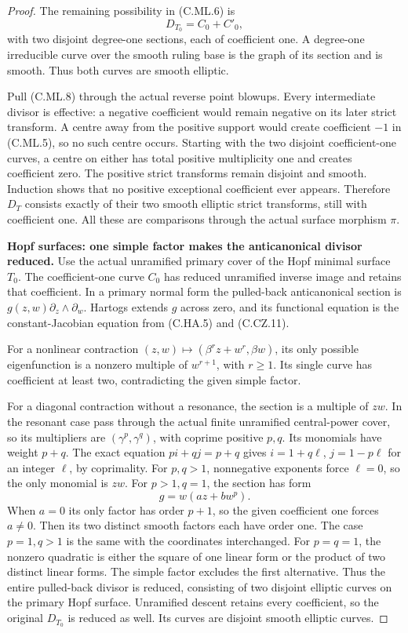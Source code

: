 \begin{proof}
The remaining possibility in (C.ML.6) is
\[
                     D_{T_0}=C_0+C'_0,
\tag{C.ML.8}
\]
with two disjoint degree-one sections, each of
coefficient one. A degree-one irreducible curve
over the smooth ruling base is the graph of
its section and is smooth. Thus both curves
are smooth elliptic.

Pull (C.ML.8) through the actual reverse point
blowups. Every intermediate divisor is effective:
a negative coefficient would remain negative
on its later strict transform. A centre away
from the positive support would create coefficient
\(-1\) in (C.ML.5), so no such centre occurs.
Starting with the two disjoint coefficient-one
curves, a centre on either has total positive
multiplicity one and creates coefficient zero.
The positive strict transforms remain disjoint
and smooth. Induction shows that no positive
exceptional coefficient ever appears. Therefore
\(D_T\) consists exactly of their two smooth
elliptic strict transforms, still with coefficient
one. All these are comparisons through the actual
surface morphism \(\pi\).

\par\medskip\noindent\textbf{Hopf surfaces: one simple factor makes the anticanonical divisor reduced.}
Use the actual unramified primary cover of the
Hopf minimal surface \(T_0\). The coefficient-one
curve \(C_0\) has reduced unramified inverse
image and retains that coefficient. In a primary
normal form the pulled-back anticanonical section
is \(g(z,w)\partial_z\wedge\partial_w\).
Hartogs extends \(g\) across zero, and its
functional equation is the constant-Jacobian
equation from (C.HA.5) and (C.CZ.11).

For a nonlinear contraction
\((z,w)\mapsto(\beta^r z+w^r,\beta w)\), its
only possible eigenfunction is a nonzero multiple
of \(w^{r+1}\), with \(r\ge1\). Its single
curve has coefficient at least two, contradicting
the given simple factor.

For a diagonal contraction without a resonance,
the section is a multiple of \(zw\). In the
resonant case pass through the actual finite
unramified central-power cover, so its multipliers
are \((\gamma^p,\gamma^q)\), with coprime
positive \(p,q\). Its monomials have weight
\(p+q\). The exact equation
\(pi+qj=p+q\) gives
\(i=1+q\ell\), \(j=1-p\ell\) for an integer
\(\ell\), by coprimality. For \(p,q>1\),
nonnegative exponents force \(\ell=0\), so the
only monomial is \(zw\). For \(p>1,q=1\), the section has form
\[
                        g=w(az+bw^p).
\tag{C.ML.9}
\]
When \(a=0\) its only factor has order \(p+1\),
so the given coefficient one forces \(a\ne0\).
Then its two distinct smooth factors each have
order one. The case \(p=1,q>1\) is the same
with the coordinates interchanged. For \(p=q=1\),
the nonzero quadratic is either the square of
one linear form or the product of two distinct
linear forms. The simple factor excludes the
first alternative. Thus the entire pulled-back
divisor is reduced, consisting of two disjoint
elliptic curves on the primary Hopf surface.
Unramified descent retains every coefficient,
so the original \(D_{T_0}\) is reduced as well.
Its curves are disjoint smooth elliptic curves.


\end{proof}
